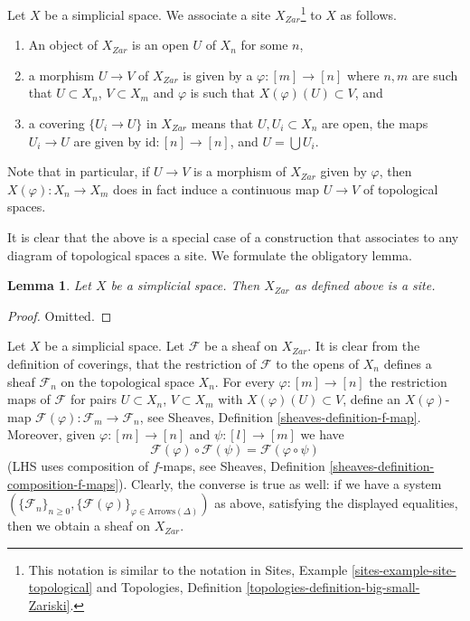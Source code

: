 \documentclass{stacks-project}
\theoremstyle{plain}
\newtheorem{lemma}[subsection]{Lemma}
\theoremstyle{definition}
\theoremstyle{remark}
\numberwithin{equation}{subsection}
\begin{document}
\medskip\noindent
Let $X$ be a simplicial space. We associate a site
$X_{Zar}$\footnote{This notation is similar to the notation in
Sites, Example \ref{sites-example-site-topological}
and
Topologies, Definition \ref{topologies-definition-big-small-Zariski}.}
to $X$ as follows.
\begin{enumerate}
\item An object of $X_{Zar}$ is an open $U$ of $X_n$ for some $n$,
\item a morphism $U \to V$ of $X_{Zar}$ is given by a
$\varphi : [m] \to [n]$ where $n, m$ are such that
$U \subset X_n$, $V \subset X_m$ and $\varphi$ is such that
$X(\varphi)(U) \subset V$, and
\item a covering $\{U_i \to U\}$ in $X_{Zar}$ means
that $U, U_i \subset X_n$ are open, the maps $U_i \to U$ are
given by $\text{id} : [n] \to [n]$, and $U = \bigcup U_i$.
\end{enumerate}
Note that in particular, if $U \to V$ is a morphism of $X_{Zar}$
given by $\varphi$, then $X(\varphi) : X_n \to X_m$ does in fact
induce a continuous map $U \to V$ of topological spaces.

\noindent
It is clear that the above is a special case of a construction that
associates to any diagram of topological spaces a site. We formulate
the obligatory lemma.

\begin{lemma}
\label{lemma-simplicial-site}
Let $X$ be a simplicial space. Then $X_{Zar}$
as defined above is a site.
\end{lemma}

\begin{proof}
Omitted.
\end{proof}

\noindent
Let $X$ be a simplicial space. Let $\mathcal{F}$ be a sheaf on $X_{Zar}$.
It is clear from the definition of coverings, that the restriction
of $\mathcal{F}$ to the opens of $X_n$ defines a sheaf $\mathcal{F}_n$
on the topological space $X_n$. For every $\varphi : [m] \to [n]$ the
restriction maps of $\mathcal{F}$ for pairs $U \subset X_n$, $V \subset X_m$
with $X(\varphi)(U) \subset V$, define an $X(\varphi)$-map
$\mathcal{F}(\varphi) : \mathcal{F}_m \to \mathcal{F}_n$, see
Sheaves, Definition \ref{sheaves-definition-f-map}.
Moreover, given $\varphi : [m] \to [n]$ and $\psi : [l] \to [m]$
we have
$$
\mathcal{F}(\varphi) \circ \mathcal{F}(\psi) =
\mathcal{F}(\varphi \circ \psi)
$$
(LHS uses composition of $f$-maps, see
Sheaves, Definition \ref{sheaves-definition-composition-f-maps}).
Clearly, the converse is true as well: if we have a system
$(\{\mathcal{F}_n\}_{n \geq 0},
\{\mathcal{F}(\varphi)\}_{\varphi \in \text{Arrows}(\Delta)})$
as above, satisfying the displayed equalities,
then we obtain a sheaf on $X_{Zar}$.
\end{document}

